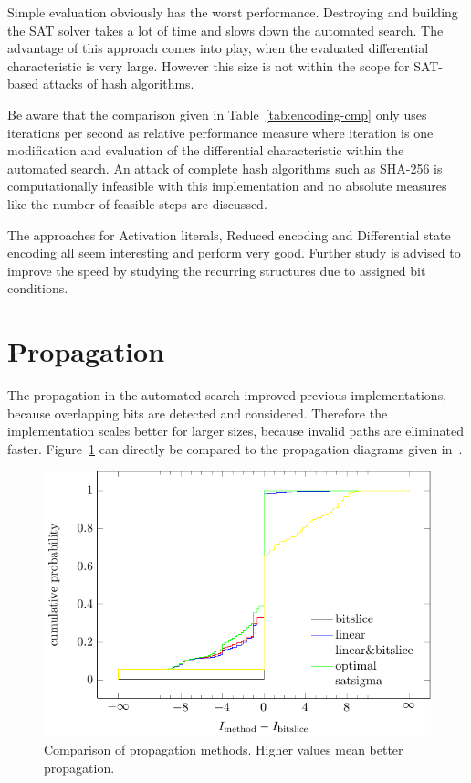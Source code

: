 Simple evaluation obviously has the worst performance. Destroying and building the SAT solver takes a lot of time and slows down the automated search. The advantage of this approach comes into play, when the evaluated differential characteristic is very large. However this size is not within the scope for SAT-based attacks of hash algorithms.

Be aware that the comparison given in Table~\ref{tab:encoding-cmp} only uses iterations per second as relative performance measure where iteration is one modification and evaluation of the differential characteristic within the automated search. An attack of complete hash algorithms such as SHA-256 is computationally infeasible with this implementation and no absolute measures like the number of feasible steps are discussed.

The approaches for Activation literals, Reduced encoding and Differential state encoding all seem interesting and perform very good. Further study is advised to improve the speed by studying the recurring structures due to assigned bit conditions.

\section{Propagation}
%
The propagation in the automated search improved previous implementations, because overlapping bits are detected and considered. Therefore the implementation scales better for larger sizes, because invalid paths are eliminated faster. Figure~\ref{fig:sat-propagation} can directly be compared to the propagation diagrams given in~\cite{Cry16}.
%
\begin{figure}[t]
 \begin{center}
  \includegraphics{img/propagation.pdf}
  \caption[Comparison of propagation methods.]{Comparison of propagation methods. Higher values mean better propagation.}
  \label{fig:sat-propagation}
 \end{center}
\end{figure}


